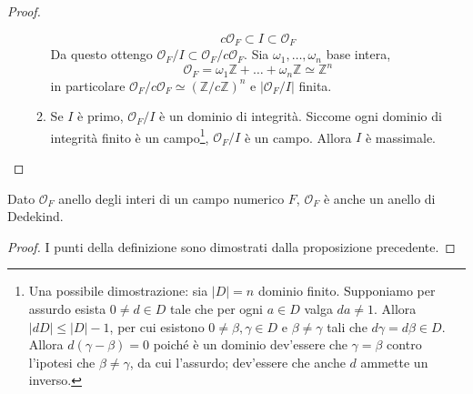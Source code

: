 \begin{proof}
\begin{enumerate}
\begin{enumerate}
			\begin{equation*}
			c\mathcal{O}_F\subset I\subset \mathcal{O}_F
			\end{equation*}
			Da questo ottengo $\mathcal{O}_F/I \subset \mathcal{O}_F/c\mathcal{O}_F$. Sia $\omega_1,\dots,\omega_n$ base intera,
			\begin{equation*}
			\mathcal{O}_F=\omega_1\mathbb{Z}+\dots+\omega_n\mathbb{Z}\simeq\mathbb{Z}^n
			\end{equation*}
			in particolare $\mathcal{O}_F/c\mathcal{O}_F\simeq\left(\mathbb{Z}/c\mathbb{Z}\right)^n$ e $\left|\mathcal{O}_F/I\right|$ finita.
			\item Se $I$ è primo, $\mathcal{O}_F/I$ è un dominio di integrità. Siccome ogni dominio di integrità finito è un campo\footnote{
				Una possibile dimostrazione: 
				sia $|D| = n$ dominio finito. 
				Supponiamo per assurdo esista $0 \neq d \in D$ 
				tale che per ogni $a \in D$ valga $da \neq 1$. 
				Allora $|dD| \le |D|-1$, per cui esistono 
				$0 \neq \beta, \gamma \in D$ e $\beta \neq \gamma$ 
				tali che $d\gamma = d\beta \in D$. 
				Allora $d(\gamma-\beta) = 0$ poiché è un dominio 
				dev'essere che $\gamma = \beta$ contro l'ipotesi 
				che $\beta \neq \gamma$, da cui l'assurdo; 
				dev'essere che anche $d$ ammette un inverso.}, $\mathcal{O}_F/I$ è un campo. Allora $I$ è massimale.
		\end{enumerate}
	\end{enumerate}
\end{proof}

\begin{teorema}
	Dato $\mathcal{O}_F$ anello degli interi di un campo numerico $F$, $\mathcal{O}_F$ è anche un anello di Dedekind.
\end{teorema}
\begin{proof}
	I punti della definizione sono dimostrati dalla proposizione precedente.
\end{proof}









